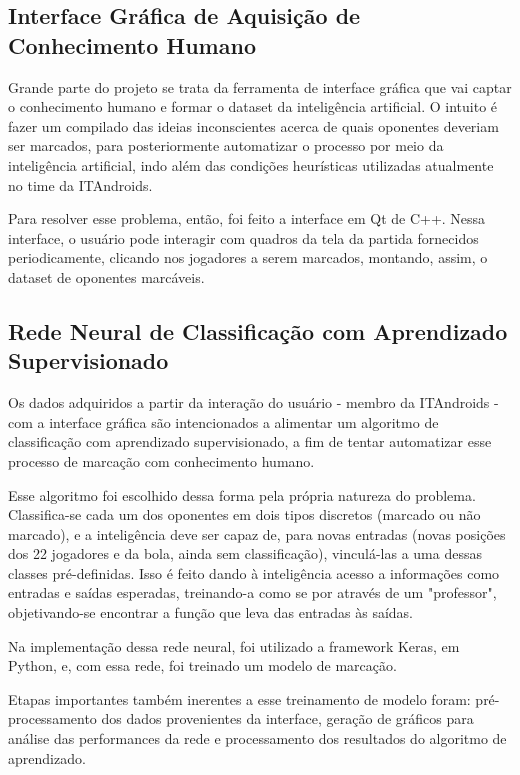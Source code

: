 \documentclass[10pt,fleqn,a4paper]{article}
\begin{document}
    \subsection{Interface Gráfica de Aquisição de Conhecimento Humano}
    
    Grande parte do projeto se trata da ferramenta de interface gráfica que vai captar o conhecimento humano e formar o dataset da inteligência artificial. O intuito é fazer um compilado das ideias inconscientes acerca de quais oponentes deveriam ser marcados, para posteriormente automatizar o processo por meio da inteligência artificial, indo além das condições heurísticas utilizadas atualmente no time da ITAndroids. 
    
    Para resolver esse problema, então, foi feito a interface em Qt de C++. Nessa interface, o usuário pode interagir com quadros da tela da partida fornecidos periodicamente, clicando nos jogadores a serem marcados, montando, assim, o dataset de oponentes marcáveis.
    
    \subsection{Rede Neural de Classificação com Aprendizado Supervisionado}
    
    Os dados adquiridos a partir da interação do usuário - membro da ITAndroids - com a interface gráfica são intencionados a alimentar um algoritmo de classificação com aprendizado supervisionado, a fim de tentar automatizar esse processo de marcação com conhecimento humano. 
    
    Esse algoritmo foi escolhido dessa forma pela própria natureza do problema. Classifica-se cada um dos oponentes em dois tipos discretos (marcado ou não marcado), e a inteligência deve ser capaz de, para novas entradas (novas posições dos 22 jogadores e da bola, ainda sem classificação), vinculá-las a uma dessas classes pré-definidas. Isso é feito dando à inteligência acesso a informações como entradas e saídas esperadas, treinando-a como se por através de um "professor", objetivando-se encontrar a função que leva das entradas às saídas.
    
    Na implementação dessa rede neural, foi utilizado a framework Keras, em Python, e, com essa rede, foi treinado um modelo de marcação.
    
    Etapas importantes também inerentes a esse treinamento de modelo foram: pré-processamento dos dados provenientes da interface, geração de gráficos para análise das performances da rede e processamento dos resultados do algoritmo de aprendizado.
\end{document}
